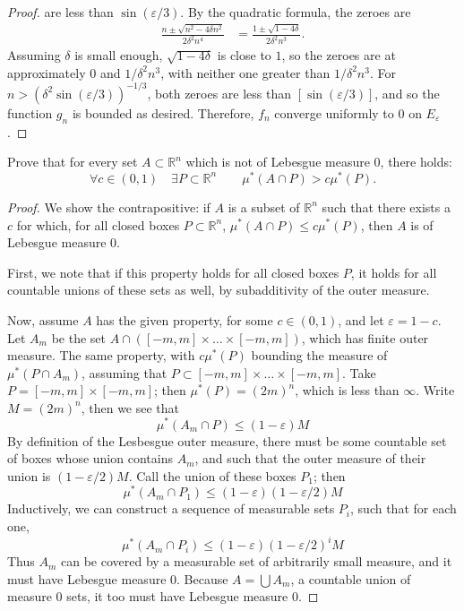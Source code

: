 \documentclass[12pt]{article}
\newcommand{\R}{\mathbb{R}}
\theoremstyle{definition}
\newenvironment{problem}[2][Problem]{\begin{trivlist}
\item[\hskip \labelsep {\bfseries #1}\hskip \labelsep {\bfseries #2.}]}{\end{trivlist}}
\begin{document}
\begin{problem}{4}
\begin{proof}
		are less than $\sin(\varepsilon/3)$. By the quadratic formula, the zeroes are
		\begin{align*}\frac{n \pm \sqrt{n^{2} - 4\delta n^2}}{2\delta^2 n^4} &= \frac{1 \pm \sqrt{1 - 4\delta}}{2\delta^2 n^3}.
		\end{align*}
		Assuming $\delta$ is small enough, $\sqrt{1 - 4\delta}$ is close to $1$, so the zeroes are at approximately $0$ and $1/\delta^2 n^3$, with neither one greater than $1/\delta^2n^{3}$. For $n > (\delta^2 \sin(\varepsilon/3))^{-1/3}$, both zeroes are less than $[\sin(\varepsilon/3)]$, and so the function $g_n$ is bounded as desired. Therefore, $f_n$ converge uniformly to $0$ on $E_\varepsilon$.
	\end{proof}
\end{problem}
\begin{problem}{5}
	Prove that for every set $A \subset \R^n$ which is not of Lebesgue measure $0$, there holds:
	\[ \forall c \in (0,1) \quad \exists P \subset \R^n \qquad \mu^{*}(A \cap P) > c \mu^*(P).\]
	\begin{proof}
		We show the contrapositive: if $A$ is a subset of $\R^n$ such that there exists a $c$ for which, for all closed boxes $P \subset \R^n$, $\mu^*(A \cap P) \leq c \mu^*(P)$, then $A$ is of Lebesgue measure $0$.
		\par First, we note that if this property holds for all closed boxes $P$, it holds for all countable unions of these sets as well, by subadditivity of the outer measure.
		\par Now, assume $A$ has the given property, for some $c \in (0,1)$, and let $\varepsilon = 1- c$. Let $A_m$ be the set $A \cap ([-m, m] \times \dots \times [-m, m])$, which has finite outer measure. The same property, with $c\mu^{*}(P)$ bounding the measure of $\mu^{*}(P \cap A_m)$, assuming that $P \subset [-m, m] \times \dots \times [-m, m]$. Take $P = [-m, m] \times [-m, m]$; then $\mu^*(P) = (2m)^n$, which is less than $\infty$. Write $M = (2m)^n$, then we see that
		\[\mu^*(A_m \cap P) \leq (1 - \varepsilon)M \]
		By definition of the Lesbesgue outer measure, there must be some countable set of boxes whose union contains $A_m$, and such that the outer measure of their union is $(1 - \varepsilon/2)M$. Call the union of these boxes $P_1$; then
		\[\mu^*(A_m \cap P_1) \leq (1-\varepsilon)(1-\varepsilon/2)M\]
		Inductively, we can construct a sequence of measurable sets $P_i$, such that for each one,
		\[\mu^{*}(A_m \cap P_i) \leq (1 - \varepsilon)(1 - \varepsilon/2)^i M\]
		Thus $A_m$ can be covered by a measurable set of arbitrarily small measure, and it must have Lebesgue measure $0$. Because $A = \bigcup A_m$, a countable union of measure $0$ sets, it too must have Lebesgue measure $0$.

	\end{proof}
\end{problem}
\begin{thebibliography}{}
\end{thebibliography}
\end{document}
